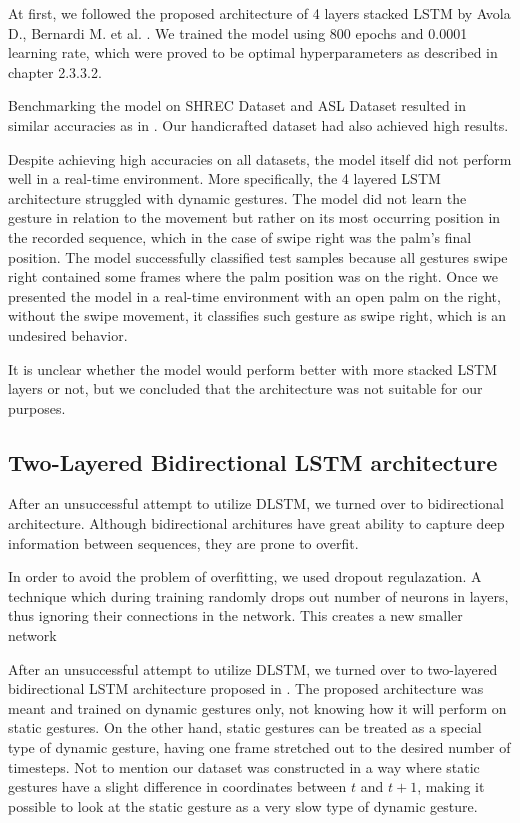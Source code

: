 At first, we followed the proposed architecture of 4 layers stacked LSTM by Avola D., Bernardi M. et al. \cite{avola}. We trained the model using 800 epochs and 0.0001 learning rate, which were proved to be optimal hyperparameters as described in chapter 2.3.3.2.

Benchmarking the model on SHREC Dataset and ASL Dataset resulted in similar accuracies as in \cite{avola}. Our handicrafted dataset had also achieved high results.

Despite achieving high accuracies on all datasets, the model itself did not perform well in a real-time environment. More specifically, the 4 layered LSTM architecture struggled with dynamic gestures. The model did not learn the gesture in relation to the movement but rather on its most occurring position in the recorded sequence, which in the case of swipe right was the palm's final position. The model successfully classified test samples because all gestures swipe right contained some frames where the palm position was on the right. Once we presented the model in a real-time environment with an open palm on the right, without the swipe movement, it classifies such gesture as swipe right, which is an undesired behavior. 

It is unclear whether the model would perform better with more stacked LSTM layers or not, but we concluded that the architecture was not suitable for our purposes. 

\subsection{Two-Layered Bidirectional LSTM architecture}

After an unsuccessful attempt to utilize DLSTM, we turned over to bidirectional architecture. Although bidirectional architures have great ability to capture deep information between sequences, they are prone to overfit. 

In order to avoid the problem of overfitting, we used dropout regulazation. 
A technique which during training randomly drops out number of neurons in layers, thus ignoring their connections in the network. This creates a new smaller network 


After an unsuccessful attempt to utilize DLSTM, we turned over to two-layered bidirectional LSTM architecture proposed in \cite{bidirect_dynam}. The proposed architecture was meant and trained on dynamic gestures only, not knowing how it will perform on static gestures. On the other hand, static gestures can be treated as a special type of dynamic gesture, having one frame stretched out to the desired number of timesteps. Not to mention our dataset was constructed in a way where static gestures have a slight difference in coordinates between $t$ and $t+1$, making it possible to look at the static gesture as a very slow type of dynamic gesture.

